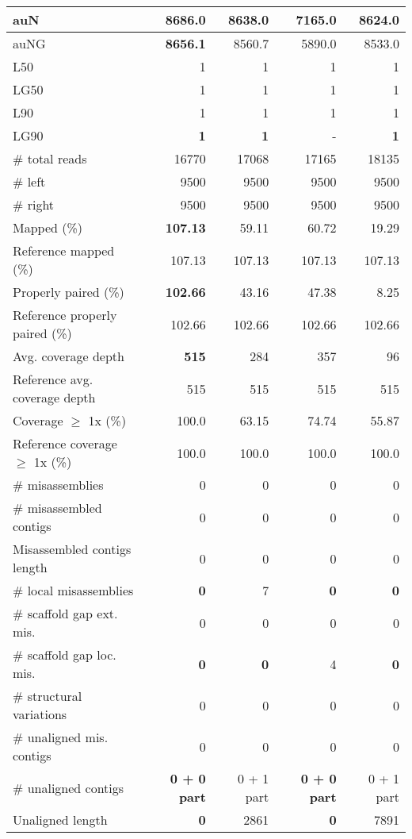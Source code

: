 \documentclass[12pt,a4paper]{article}
\begin{document}
\begin{table}[ht]
\begin{center}
\begin{tabular}{|l*{4}{|r}|}
auN & {\bf 8686.0} & 8638.0 & 7165.0 & 8624.0 \\ \hline
auNG & {\bf 8656.1} & 8560.7 & 5890.0 & 8533.0 \\ \hline
L50 & 1 & 1 & 1 & 1 \\ \hline
LG50 & 1 & 1 & 1 & 1 \\ \hline
L90 & 1 & 1 & 1 & 1 \\ \hline
LG90 & {\bf 1} & {\bf 1} & - & {\bf 1} \\ \hline
\# total reads & 16770 & 17068 & 17165 & 18135 \\ \hline
\# left & 9500 & 9500 & 9500 & 9500 \\ \hline
\# right & 9500 & 9500 & 9500 & 9500 \\ \hline
Mapped (\%) & {\bf 107.13} & 59.11 & 60.72 & 19.29 \\ \hline
Reference mapped (\%) & 107.13 & 107.13 & 107.13 & 107.13 \\ \hline
Properly paired (\%) & {\bf 102.66} & 43.16 & 47.38 & 8.25 \\ \hline
Reference properly paired (\%) & 102.66 & 102.66 & 102.66 & 102.66 \\ \hline
Avg. coverage depth & {\bf 515} & 284 & 357 & 96 \\ \hline
Reference avg. coverage depth & 515 & 515 & 515 & 515 \\ \hline
Coverage $\geq$ 1x (\%) & 100.0 & 63.15 & 74.74 & 55.87 \\ \hline
Reference coverage $\geq$ 1x (\%) & 100.0 & 100.0 & 100.0 & 100.0 \\ \hline
\# misassemblies & 0 & 0 & 0 & 0 \\ \hline
\# misassembled contigs & 0 & 0 & 0 & 0 \\ \hline
Misassembled contigs length & 0 & 0 & 0 & 0 \\ \hline
\# local misassemblies & {\bf 0} & 7 & {\bf 0} & {\bf 0} \\ \hline
\# scaffold gap ext. mis. & 0 & 0 & 0 & 0 \\ \hline
\# scaffold gap loc. mis. & {\bf 0} & {\bf 0} & 4 & {\bf 0} \\ \hline
\# structural variations & 0 & 0 & 0 & 0 \\ \hline
\# unaligned mis. contigs & 0 & 0 & 0 & 0 \\ \hline
\# unaligned contigs & {\bf 0 + 0 part} & 0 + 1 part & {\bf 0 + 0 part} & 0 + 1 part \\ \hline
Unaligned length & {\bf 0} & 2861 & {\bf 0} & 7891 \\ \hline

\end{tabular}
\end{center}
\end{table}
\end{document}
